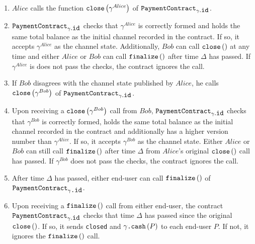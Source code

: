     \begin{enumerate}
      \item $Alice$ calls the function $\mbox{\texttt{close}}\left(\gamma^{Alice}\right)$
      of $\mbox{\texttt{PaymentContract}}_{\gamma\mbox{.\texttt{id}}}$.
      \item $\mbox{\texttt{PaymentContract}}_{\gamma\mbox{.\texttt{id}}}$ checks that
      $\gamma^{Alice}$ is correctly formed and holds the same total balance
      as the initial channel recorded in the contract. If so, it accepts $\gamma^{Alice}$
      as the channel state. Additionally, $Bob$ can call
      $\mbox{\texttt{close}}\left(\right)$ at any time and either $Alice$ or $Bob$ can
      call $\mbox{\texttt{finalize}}\left(\right)$ after time $\Delta$ has passed. If
      $\gamma^{Alice}$ is does not pass the checks, the contract ignores the call.
      \item If $Bob$ disagrees with the channel state published by $Alice$, he calls
      $\mbox{\texttt{close}}\left(\gamma^{Bob}\right)$ of
      $\mbox{\texttt{PaymentContract}}_{\gamma\mbox{.\texttt{id}}}$.
      \item Upon receiving a $\mbox{\texttt{close}}\left(\gamma^{Bob}\right)$ call from
      $Bob$, $\mbox{\texttt{PaymentContract}}_{\gamma\mbox{.\texttt{id}}}$ checks that
      $\gamma^{Bob}$ is correctly formed, holds the same total balance as the initial
      channel recorded in the contract and additionally has a higher version number than
      $\gamma^{Alice}$. If so, it accepts $\gamma^{Bob}$ as the channel state. Either
      $Alice$ or $Bob$ can still call $\mbox{\texttt{finalize}}\left(\right)$ after time
      $\Delta$ from $Alice$'s original $\mbox{\texttt{close}}\left(\right)$ call has
      passed. If $\gamma^{Bob}$ does not pass the checks, the contract ignores the call.
      \item After time $\Delta$ has passed, either end-user can call
      $\mbox{\texttt{finalize}}\left(\right)$ of
      $\mbox{\texttt{PaymentContract}}_{\gamma\mbox{\texttt{.id}}}$.
      \item Upon receiving a $\mbox{\texttt{finalize}}\left(\right)$ call from either
      end-user, the contract $\mbox{\texttt{PaymentContract}}_{\gamma\mbox{.\texttt{id}}}$
      checks that time $\Delta$ has passed since the original
      $\mbox{\texttt{close}}\left(\right)$. If so, it sends \texttt{closed} and
      $\gamma\mbox{\texttt{.cash}}\left(P\right)$ to each end-user $P$. If not, it ignores
      the $\mbox{\texttt{finalize}}\left(\right)$ call.
    \end{enumerate}


